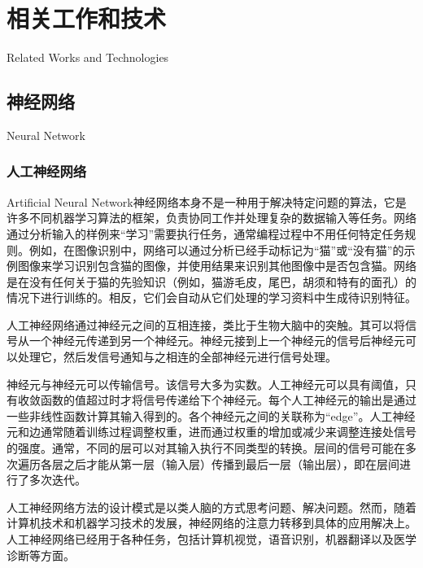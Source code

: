 \chapter{相关工作和技术}{Related Works and Technologies}
\section{神经网络}{Neural Network}

\subsection{人工神经网络}{Artificial Neural Network}\cite{ wiki:Artificial_neural_network}神经网络本身不是一种用于解决特定问题的算法，它是许多不同机器学习算法的框架，负责协同工作并处理复杂的数据输入等任务。网络通过分析输入的样例来“学习”需要执行任务，通常编程过程中不用任何特定任务规则。例如，在图像识别中，网络可以通过分析已经手动标记为“猫”或“没有猫”的示例图像来学习识别包含猫的图像，并使用结果来识别其他图像中是否包含猫。网络是在没有任何关于猫的先验知识（例如，猫游毛皮，尾巴，胡须和特有的面孔）的情况下进行训练的。相反，它们会自动从它们处理的学习资料中生成待识别特征。

人工神经网络通过神经元之间的互相连接，类比于生物大脑中的突触。其可以将信号从一个神经元传递到另一个神经元。神经元接到上一个神经元的信号后神经元可以处理它，然后发信号通知与之相连的全部神经元进行信号处理。

神经元与神经元可以传输信号。该信号大多为实数。人工神经元可以具有阈值，只有收敛函数的值超过时才将信号传递给下个神经元。每个人工神经元的输出是通过一些非线性函数计算其输入得到的。各个神经元之间的关联称为“edge”。人工神经元和边通常随着训练过程调整权重，进而通过权重的增加或减少来调整连接处信号的强度。通常，不同的层可以对其输入执行不同类型的转换。层间的信号可能在多次遍历各层之后才能从第一层（输入层）传播到最后一层（输出层），即在层间进行了多次迭代。

人工神经网络方法的设计模式是以类人脑的方式思考问题、解决问题。然而，随着计算机技术和机器学习技术的发展，神经网络的注意力转移到具体的应用解决上。人工神经网络已经用于各种任务，包括计算机视觉，语音识别，机器翻译以及医学诊断等方面。

